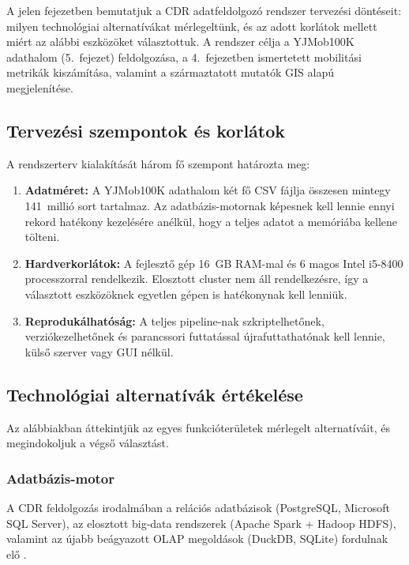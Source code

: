 
A jelen fejezetben bemutatjuk a CDR adatfeldolgozó rendszer tervezési döntéseit: milyen technológiai alternatívákat mérlegeltünk, és az adott korlátok mellett miért az alábbi eszközöket választottuk. A rendszer célja a YJMob100K adathalom (5.\ fejezet) feldolgozása, a 4.\ fejezetben ismertetett mobilitási metrikák kiszámítása, valamint a származtatott mutatók GIS alapú megjelenítése.

\subsection{Tervezési szempontok és korlátok}

A rendszerterv kialakítását három fő szempont határozta meg:
\begin{enumerate}
    \item \textbf{Adatméret:} A YJMob100K adathalom két fő CSV fájlja összesen mintegy 141~millió sort tartalmaz. Az adatbázis-motornak képesnek kell lennie ennyi rekord hatékony kezelésére anélkül, hogy a teljes adatot a memóriába kellene tölteni.
    \item \textbf{Hardverkorlátok:} A fejlesztő gép 16~GB RAM-mal és 6 magos Intel i5-8400 processzorral rendelkezik. Elosztott cluster nem áll rendelkezésre, így a választott eszközöknek egyetlen gépen is hatékonynak kell lenniük.
    \item \textbf{Reprodukálhatóság:} A teljes pipeline-nak szkriptelhetőnek, verziókezelhetőnek és parancssori futtatással újrafuttathatónak kell lennie, külső szerver vagy GUI nélkül.
\end{enumerate}

\subsection{Technológiai alternatívák értékelése}

Az alábbiakban áttekintjük az egyes funkcióterületek mérlegelt alternatíváit, és megindokoljuk a végső választást.

\subsubsection{Adatbázis-motor}

A CDR feldolgozás irodalmában a relációs adatbázisok (PostgreSQL, Microsoft SQL Server), az elosztott big-data rendszerek (Apache Spark + Hadoop HDFS), valamint az újabb beágyazott OLAP megoldások (DuckDB, SQLite) fordulnak elő \cite{zhang2019connected, pinter2020artificial}.

